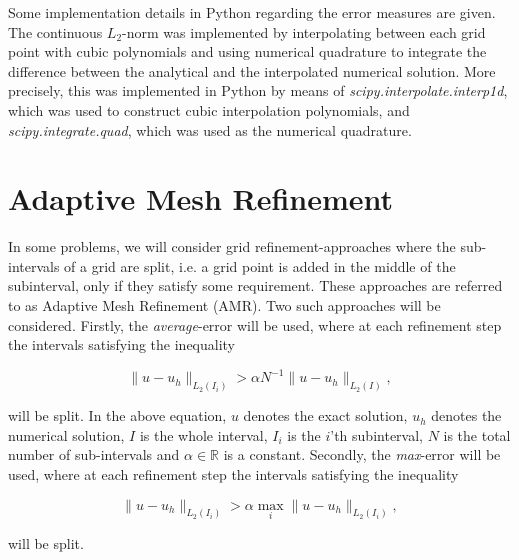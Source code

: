 Some implementation details in Python regarding the error measures are given. The continuous $L_2$-norm was implemented by interpolating between each grid point with cubic polynomials and using numerical quadrature to integrate the difference between the analytical and the interpolated numerical solution. More precisely, this was implemented in Python by means of \textit{scipy.interpolate.interp1d}, which was used to construct cubic interpolation polynomials, and \textit{scipy.integrate.quad}, which was used as the numerical quadrature.

\section{Adaptive Mesh Refinement}
\label{adaptive}

In some problems, we will consider grid refinement-approaches where the sub-intervals of a grid are split, i.e. a grid point is added in the middle of the subinterval, only if they satisfy some requirement. These approaches are referred to as Adaptive Mesh Refinement (AMR). Two such approaches will be considered. Firstly, the \textit{average}-error will be used, where at each refinement step the intervals satisfying the inequality

\begin{equation*}
    \|u - u_h\|_{L_2(I_i)} > \alpha N^{-1} \|u - u_h\|_{L_2(I)},
\end{equation*}

\noindent will be split. In the above equation, $u$ denotes the exact solution, $u_h$ denotes the numerical solution, $I$ is the whole interval, $I_i$ is the $i$'th  subinterval, $N$ is the total number of sub-intervals and $\alpha \in \mathbb{R}$ is a constant. Secondly, the \textit{max}-error will be used, where at each refinement step the intervals satisfying the inequality

\begin{equation*}
    \|u - u_h\|_{L_2(I_i)} > \alpha \max_i \|u - u_h\|_{L_2(I_i)}, 
\end{equation*}

\noindent will be split. 
